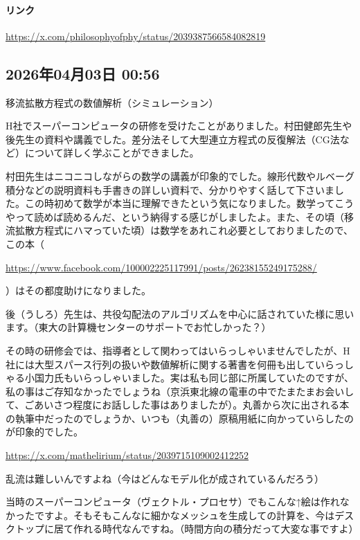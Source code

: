 \documentclass[facebook_diary.tex]{subfiles}
\begin{document}
\paragraph{リンク}
\url{https://x.com/philosophyofphy/status/2039387566584082819}

\subsection*{2026年04月03日 00:56}

移流拡散方程式の数値解析（シミュレーション）


H社でスーパーコンピュータの研修を受けたことがありました。村田健郎先生や後先生の資料や講義でした。差分法そして大型連立方程式の反復解法（CG法など）について詳しく学ぶことができました。


村田先生はニコニコしながらの数学の講義が印象的でした。線形代数やルベーグ積分などの説明資料も手書きの詳しい資料で、分かりやすく話して下さいました。この時初めて数学が本当に理解できたという気になりました。数学ってこうやって読めば読めるんだ、という納得する感じがしましたよ。また、その頃（移流拡散方程式にハマっていた頃）は数学をあれこれ必要としておりましたので、この本（ 

\url{https://www.facebook.com/100002225117991/posts/26238155249175288/}

 ）はその都度助けになりました。

後（うしろ）先生は、共役勾配法のアルゴリズムを中心に話されていた様に思います。（東大の計算機センターのサポートでお忙しかった？）


その時の研修会では、指導者として関わってはいらっしゃいませんでしたが、H社には大型スパース行列の扱いや数値解析に関する著書を何冊も出していらっしゃる小国力氏もいらっしゃいました。実は私も同じ部に所属していたのですが、私の事はご存知なかったでしょうね（京浜東北線の電車の中でたまたまお会いして、ごあいさつ程度にお話しした事はありましたが）。丸善から次に出される本の執筆中だったのでしょうか、いつも（丸善の）原稿用紙に向かっていらしたのが印象的でした。


\url{https://x.com/mathelirium/status/2039715109002412252}




乱流は難しいんですよね（今はどんなモデル化が成されているんだろう）

当時のスーパーコンピュータ（ヴェクトル・プロセサ）でもこんな↑絵は作れなかったですよ。そもそもこんなに細かなメッシュを生成しての計算を、今はデスクトップに居て作れる時代なんですね。（時間方向の積分だって大変な事ですよ）
\end{document}

